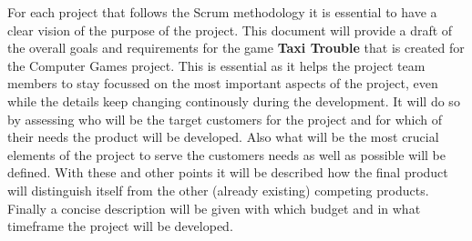 For each project that follows the Scrum methodology it is essential to have a clear vision of the purpose of the project. This document will provide a draft of the overall goals and requirements for the game \textbf{Taxi Trouble} that is created for the Computer Games project. This is essential as it helps the project team members to stay focussed on the most important aspects of the project, even while the details keep changing continously during the development. It will do so by assessing who will be the target customers for the project and for which of their needs the product will be developed. Also what will be the most crucial elements of the project to serve the customers needs as well as possible will be defined. With these and other points it will be described how the final product will distinguish itself from the other (already existing) competing products. Finally a concise description will be given with which budget and in what timeframe the project will be developed.